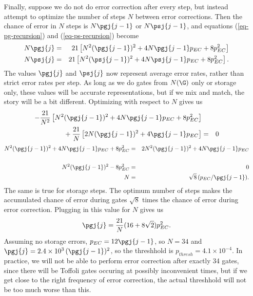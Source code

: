 Finally, suppose we do not do error correction after every step, but instead
attempt to optimize the number of steps $N$ between error corrections.
Then the chance of error in $N$ steps is $N \pgj{j-1}$ or $N \psj{j-1}$, and
equations (\ref{eq-pg-recursion}) and (\ref{eq-ps-recursion}) become
\begin{eqnarray}
	N \pgj{j} & = & 21 \left[N^2 (\pgj{j-1})^2 + 4 N \pgj{j-1} p_{EC} + 8 p_{EC}^2
	\right] \\
	N \psj{j} & = & 21 \left[N^2 (\psj{j-1})^2 + 4 N \psj{j-1} p_{EC} + 8 p_{EC}^2
	\right].
\end{eqnarray}
The values $\pgj{j}$ and $\psj{j}$ now represent average error rates,
rather than strict error rates per step.  As long as we do gates from
$N(\G)$ only or storage only, these values will be accurate representations,
but if we mix and match, the story will be a bit different.  Optimizing with
respect to $N$ gives us
\begin{eqnarray}
	-\frac{21}{N^2} \left[N^2 (\pgj{j-1})^2 + 4 N \pgj{j-1} p_{EC} + 8 p_{EC}^2
	\right] & & \\
	\mbox{} + \frac{21}{N} \left[2 N (\pgj{j-1})^2 + 4 \pgj{j-1} p_{EC} \right]
	& = & 0
\end{eqnarray}
\vspace{-\belowdisplayskip}
\begin{eqnarray}
	N^2 (\pgj{j-1})^2 + 4 N \pgj{j-1} p_{EC} + 8 p_{EC}^2 & = & 2 N^2
	(\pgj{j-1})^2 + 4 N \pgj{j-1} p_{EC} \nonumber \\ \\
	N^2 (\pgj{j-1})^2 - 8 p_{EC}^2 & = & 0 \\
	N & = & \sqrt{8}\,(p_{EC}/\pgj{j-1}).
\end{eqnarray}
The same is true for storage steps.  The optimum number of steps makes
the accumulated chance of error during gates $\sqrt{8}$ times the chance
of error during error correction.  Plugging in this value for $N$ gives us
\begin{equation}
	\pgj{j} = \frac{21}{N} (16 + 8 \sqrt{2}) p_{EC}^2.
\end{equation}
Assuming no storage errors, $p_{EC} = 12 \pgj{j-1}$, so $N =
34$ and $\pgj{j} = 2.4 \times 10^3\,(\pgj{j-1})^2$, so the threshhold is
$p_{thresh} = 4.1 \times 10^{-4}$.  In practice, we will not be able to perform
error correction after exactly 34 gates, since there will be Toffoli gates
occuring at possibly inconvenient times, but if we get close to the right
frequency of error correction, the actual threshhold will not be too much
worse than this.

